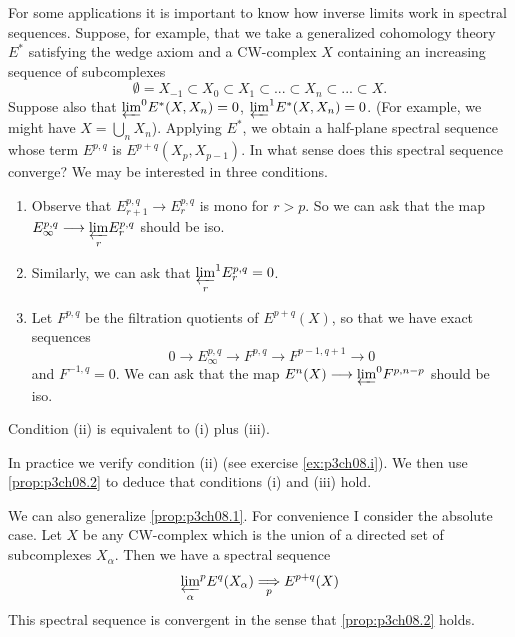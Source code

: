 \documentclass[../main]{subfiles}
\begin{document}
\par For some applications it is important to know how inverse limits work in spectral sequences. Suppose, for example, that we take a generalized cohomology theory $E^*$ satisfying the wedge axiom and a CW-complex $X$ containing an increasing sequence of subcomplexes
\[\emptyset = X_{-1}\subset X_0\subset X_1\subset ... \subset X_n\subset ... \subset X.\]
Suppose also that ${\varprojlim}^0E^*(X,X_n)=0$,  ${\varprojlim}^1E^*(X,X_n)=0$. (For example, we might have $X=\bigcup_nX_n$). Applying $E^*$, we obtain a half-plane spectral sequence whose term $E^{p,q}$ is $E^{p+q}(X_p, X_{p-1})$. In what sense does this spectral sequence converge? We may be interested in three conditions.
\begin{enumerate}[wide=\parindent]
    \item Observe that $E_{r+1}^{p,q}\longrightarrow E_r^{p,q}$ is mono for $r>p$. So we can ask that the map $E_\infty^{p,q}\longrightarrow \underset{r}{\varprojlim} E_r^{p,q}$ should be iso.
    \item Similarly, we can ask that $\underset{r}{\varprojlim}^1E_r^{p,q}=0$.
    \item Let $F^{p,q}$ be the filtration quotients of $E^{p+q}(X)$, so that we have exact sequences
    \[0\longrightarrow E_{\infty}^{p,q}\longrightarrow F^{p,q} \longrightarrow F^{p-1,q+1} \longrightarrow 0\]
    and $F^{-1,q}=0$. We can ask that the map $E^n(X)\longrightarrow {\varprojlim}^0F^{p,n-p}$ should be iso.
\end{enumerate}
\begin{theorem}\label{prop:p3ch08.2}
Condition (ii) is equivalent to (i) plus (iii). 
\end{theorem}
In practice we verify condition (ii) (see exercise \ref{ex:p3ch08.i}). We then use \ref{prop:p3ch08.2} to deduce that conditions (i) and (iii) hold.
\par We can also generalize \ref{prop:p3ch08.1}. For convenience I consider the absolute case. Let $X$ be any CW-complex which is the union of a directed set of subcomplexes $X_\alpha$. Then we have a spectral sequence
\[{\varprojlim_\alpha}^pE^q(X_\alpha) \underset{p}{\Longrightarrow} E^{p+q}(X)\]
This spectral sequence is convergent in the sense that \ref{prop:p3ch08.2} holds.
\end{document}
